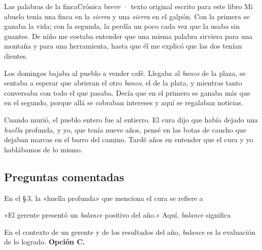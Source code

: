\begin{texto}{Las palabras de la finca}{Crónica breve · texto original escrito para este libro}
\pa Mi abuelo tenía una finca en la \emph{sierra} y una \emph{sierra} en el galpón. Con la primera se ganaba la vida; con la
segunda, la perdía un poco cada vez que la usaba sin guantes. De niño me costaba entender que una misma palabra sirviera
para una montaña y para una herramienta, hasta que él me explicó que las dos tenían dientes.

\pa Los domingos bajaba al pueblo a vender café. Llegaba al \emph{banco} de la plaza, se sentaba a esperar que abrieran el
otro \emph{banco}, el de la plata, y mientras tanto conversaba con todo el que pasaba. Decía que en el primero se ganaba más
que en el segundo, porque allá se cobraban intereses y aquí se regalaban noticias.

\pa Cuando murió, el pueblo entero fue al entierro. El cura dijo que había dejado una \emph{huella} profunda, y yo, que
tenía nueve años, pensé en las botas de caucho que dejaban marcas en el barro del camino. Tardé años en entender que el
cura y yo hablábamos de lo mismo.
\end{texto}

\subsection{Preguntas comentadas}
\begin{comentada}{En el \S\,3, la «huella profunda» que menciona el cura se refiere a}
\end{comentada}

\begin{reto}
«El gerente presentó un \emph{balance} positivo del año.» Aquí, \emph{balance} significa
\end{reto}

\begin{retoresuelto}
En el contexto de un gerente y de los resultados del año, \emph{balance} es la evaluación de lo logrado. \textbf{Opción C.}
\end{retoresuelto}

